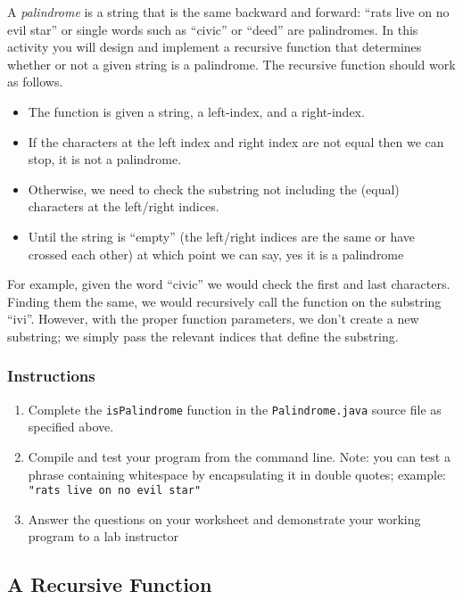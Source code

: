 \documentclass[12pt]{scrartcl}
\begin{document}
A \emph{palindrome} is a string that is the same backward and 
forward: ``rats live on no evil star'' or single words such as ``civic'' 
or ``deed'' are palindromes.  In this activity you will design and 
implement a recursive function that determines whether or not 
a given string is a palindrome.  The recursive function should 
work as follows.  
\begin{itemize}
  \item The function is given a string, a left-index, and a right-index.
  \item If the characters at the left index and right index are not 
	equal then we can stop, it is not a palindrome.
  \item Otherwise, we need to check the substring not including the 
	(equal) characters at the left/right indices.
  \item Until the string is ``empty'' (the left/right indices are the same 
	or have crossed each other) at which point we can say, yes it 
	is a palindrome
\end{itemize}

For example, given the word ``civic'' we would check the first and 
last characters.  Finding them the same, we would recursively call 
the function on the substring ``ivi''.  However, with the proper function 
parameters, we don't create a new substring; we simply pass the 
relevant indices that define the substring.

\subsubsection*{Instructions}

\begin{enumerate}
  \item Complete the \texttt{isPalindrome} function in the 
	\texttt{Palindrome.java} source file as specified above.
  \item Compile and test your program from the command line.  
	Note: you can test a phrase containing whitespace by encapsulating 
	it in double quotes; example: \\
	\texttt{"rats live on no evil star"}
  \item Answer the questions on your worksheet and demonstrate your 
  	working program to a lab instructor
\end{enumerate}
	
\subsection{A Recursive Function}
\end{document}
